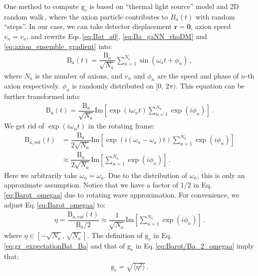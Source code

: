 One method to compute $\mathrm{g}_{r}$ is based on ``thermal light source'' model and 2D random walk\,\cite{Loudon2000TheQT, budker2021physics}, where the axion particle contributes to ${B}_{a}(t)$ with random ``steps''. In our case, we can take detector displacement $\mathbf{r} = \mathbf{0}$, axion speed $v_n=v_a$, and rewrite Eqs.\,\eqref{eq:Bat_a0}, \eqref{eq:Ba_gaNN_rhoDM} and \eqref{eq:axion_ensemble_gradient} into:
\begin{align}
    \mathrm{B}_{a}(t) = \dfrac{\mathrm{B}_{a}}{\sqrt{N_a}}\sum_{n=1}^{N_a} \sin(\omega_a t + \phi_n)\,,
\end{align}
where $N_a$ is the number of axions, and $v_n$ and $\phi_n$ are the speed and phase of $n$-th axion respectively. $\phi_n$ is randomly distributed on $[0,\,2\pi)$. 
This equation can be further transformed into:
\begin{align}
    \mathrm{B}_{a}(t) = \dfrac{\mathrm{B}_{a}}{\sqrt{N_a}} 
    \mathrm{Im}[\exp\left( i\omega_n t \right) \sum_{n=1}^{N_a} \exp\left( i \phi_n\right)]
    \,.\label{eq:Bat_sum_va}
\end{align}
We get rid of $\exp\left( i\omega_n t \right)$ in the rotating frame: 
\begin{align}
    \mathrm{B}_{a, rot}(t) &= \dfrac{\mathrm{B}_{a}}{2\sqrt{N_a}} 
    \mathrm{Im}[\exp\left( i (\omega_n - \omega_a ) t \right) \sum_{n=1}^{N_a} \exp\left( i \phi_n\right)]\\
    &\approx \dfrac{\mathrm{B}_{a}}{2\sqrt{N_a}} \mathrm{Im}[\sum_{n=1}^{N_a} \exp\left( i \phi_n\right)]
    \,. \label{eq:Barot_omegaa}
\end{align}
Here we arbitrarily take $\omega_n = \omega_a$. Due to the distribution of $\omega_n$, this is only an approximate assumption. Notice that we have a factor of 1/2 in Eq.\,\eqref{eq:Barot_omegaa} due to rotating wave approximation. 
For convenience, we adjust Eq.\,\eqref{eq:Barot_omegaa} to:
\begin{align}
    \eta = \dfrac{\mathrm{B}_{a, rot}(t)}{\mathrm{B}_{a}/2} 
    \approx \dfrac{1}{\sqrt{N_a}} \mathrm{Im}[\sum_{n=1}^{N_a} \exp(i \phi_n)]
    \,. \label{eq:Barot/Ba_2_omegaa}
\end{align}
where $\eta \in [- \sqrt{N_a},\,\sqrt{N_a} ]$. 
The definition of $\mathrm{g}_{r}$ in Eq.\,\eqref{eq:gr_expectationBat_Ba} and that of $\mathrm{g}_{r}$ in Eq.\,\eqref{eq:Barot/Ba_2_omegaa} imply that:
\begin{align}
    \mathrm{g}_{r} = \sqrt{\langle \eta^2 \rangle}\,.\label{eq:gr_eta}
\end{align}

